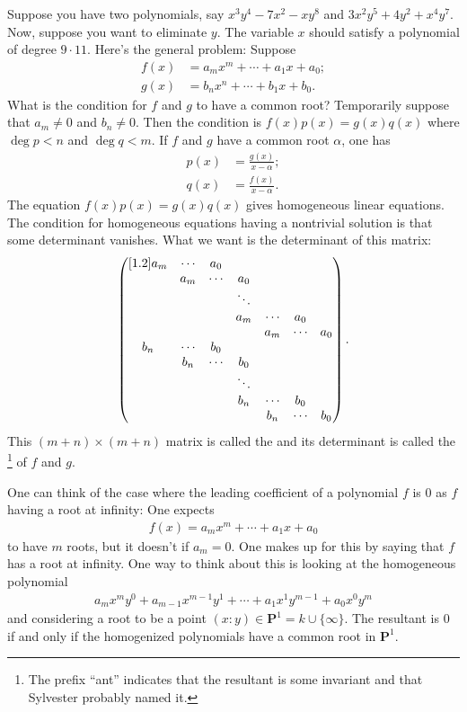 \documentclass[11pt, oneside,margin=1in]{article}
\begin{document}
		Suppose you have two polynomials, say $x^3y^4 - 7x^2-xy^8$ and $3x^2y^5+4y^2+x^4y^7$. Now, suppose you want to eliminate $y$. The variable $x$ should satisfy a polynomial of degree $9\cdot 11$. Here's the general problem: Suppose
		\begin{align*}
			f(x)&=a_mx^m+\cdots +  a_1x+a_0;\\
			g(x)&=b_nx^n+\cdots +  b_1x+b_0.
		\end{align*}
What is the condition for $f$ and $g$ to have a common root? Temporarily suppose that $a_m\ne 0$ and $b_n\ne 0$. Then the condition is $f(x)p (x)=g (x)q (x)$ where $\deg p<n$ and $\deg q<m$. If $f$ and $g$ have a common root $\alpha$, one has
\begin{align*}
	p(x)&= \frac{g(x)}{x-\alpha};\\
	q(x)&= \frac{f(x)}{x-\alpha}.
\end{align*}
The equation $f(x)p (x)=g (x)q (x)$ gives homogeneous linear equations. The condition for homogeneous equations having a nontrivial solution is that some determinant vanishes. What we want is the determinant of this matrix:
\begin{align*}
	\begin{pmatrix} [ 1.2 ] a_m & \cdots & a_0 && &&\\ & a_m & \cdots & a_0& &&\\ &&&\ddots&&&\\&&&a_m & \cdots & a_0\\&&&&a_m & \cdots & a_0\\b_n & \cdots & b_0 && &&\\ & b_n & \cdots & b_0& &&\\ &&&\ddots&&&\\&&&b_n & \cdots & b_0\\&&&&b_n & \cdots & b_0 \end{pmatrix}.
\end{align*}
This $ (m+n)\times  (m+n)$ matrix is called the  and its determinant is called the \footnote{The prefix ``ant'' indicates that the resultant is some invariant and that Sylvester probably named it.} of $f$ and $g$.

\begin{remark}\label{ifffffffffff}
	One can think of the case where the leading coefficient of a polynomial $f$ is $0$ as $f$ having a root at infinity: One expects
	\begin{align*}
		f(x) = a_mx^m+\cdots+a_1x+a_0
	\end{align*}
	to have $m$ roots, but it doesn't if $a_m=0$. One makes up for this by saying that $f$ has a root at infinity. One way to think about this is looking at the homogeneous polynomial
	\begin{align*}
		a_mx^my^0 + a_{m-1}x^{m-1}y^1+\cdots +a_1x^1y^{m-1} +a_0x^0y^m
	\end{align*}
	and considering a root to be a point $(x:y)\in  \mathbf{P}^1 = k\cup \{\infty\}$. The resultant is $0$ if and only if the homogenized polynomials have a common root in $\mathbf{P}^1$.
\end{remark}
\end{document}
